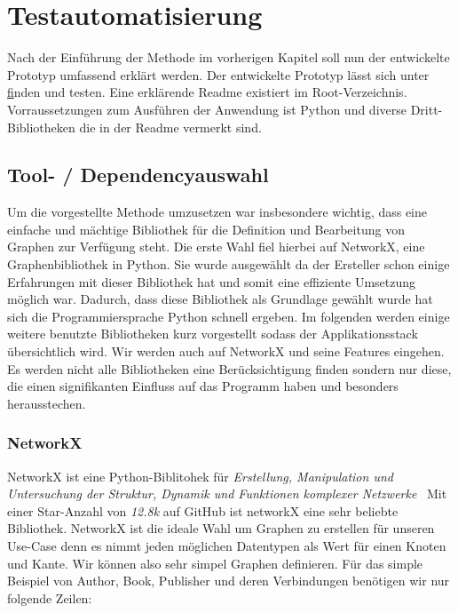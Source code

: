 \chapter{Testautomatisierung}
\label{testautomatisierung}

Nach der Einführung der Methode im vorherigen Kapitel soll nun der entwickelte Prototyp umfassend erklärt werden.
Der entwickelte Prototyp lässt sich unter \href{https://github.com/gernhard1337/graphql-primepath-tester} finden und testen.
Eine erklärende Readme existiert im Root-Verzeichnis.
Vorraussetzungen zum Ausführen der Anwendung ist Python und diverse Dritt-Bibliotheken die in der Readme vermerkt sind.

\section{Tool- / Dependencyauswahl}
Um die vorgestellte Methode umzusetzen war insbesondere wichtig, dass eine einfache und mächtige Bibliothek für die Definition und Bearbeitung
von Graphen zur Verfügung steht.
Die erste Wahl fiel hierbei auf NetworkX, eine Graphenbibliothek in Python.
Sie wurde ausgewählt da der Ersteller schon einige Erfahrungen mit dieser Bibliothek hat und somit eine effiziente Umsetzung möglich war.
Dadurch, dass diese Bibliothek als Grundlage gewählt wurde hat sich die Programmiersprache Python schnell ergeben.
Im folgenden werden einige weitere benutzte Bibliotheken kurz vorgestellt sodass der Applikationsstack übersichtlich wird.
Wir werden auch auf NetworkX und seine Features eingehen.
Es werden nicht alle Bibliotheken eine Berücksichtigung finden sondern nur diese, die einen signifikanten Einfluss auf das Programm haben und besonders herausstechen.

\subsection{NetworkX}

NetworkX ist eine Python-Biblitohek für \textit{Erstellung, Manipulation und Untersuchung der Struktur, Dynamik und Funktionen komplexer Netzwerke}~\cite[vgl. Startseite]{networkx}
Mit einer Star-Anzahl von \textit{12.8k}\cite{networkxgithub} auf GitHub ist networkX eine sehr beliebte Bibliothek.
NetworkX ist die ideale Wahl um Graphen zu erstellen für unseren Use-Case denn es nimmt jeden möglichen Datentypen als Wert für einen Knoten und Kante.
Wir können also sehr simpel Graphen definieren.
Für das simple Beispiel von Author, Book, Publisher und deren Verbindungen benötigen wir nur folgende Zeilen:

